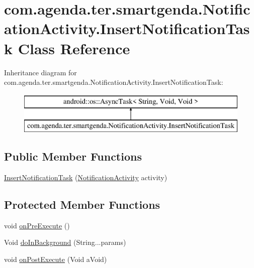 \hypertarget{classcom_1_1agenda_1_1ter_1_1smartgenda_1_1_notification_activity_1_1_insert_notification_task}{\section{com.\-agenda.\-ter.\-smartgenda.\-Notification\-Activity.\-Insert\-Notification\-Task Class Reference}
\label{classcom_1_1agenda_1_1ter_1_1smartgenda_1_1_notification_activity_1_1_insert_notification_task}
}
Inheritance diagram for com.\-agenda.\-ter.\-smartgenda.\-Notification\-Activity.\-Insert\-Notification\-Task\-:\begin{figure}[H]
\begin{center}
\leavevmode
\includegraphics[height=2.000000cm]{classcom_1_1agenda_1_1ter_1_1smartgenda_1_1_notification_activity_1_1_insert_notification_task}
\end{center}
\end{figure}
\subsection*{Public Member Functions}
\begin{DoxyCompactItemize}
\item 
\hyperlink{classcom_1_1agenda_1_1ter_1_1smartgenda_1_1_notification_activity_1_1_insert_notification_task_a1f0ccf74c8407d3039a131873cbb4ee0}{Insert\-Notification\-Task} (\hyperlink{classcom_1_1agenda_1_1ter_1_1smartgenda_1_1_notification_activity}{Notification\-Activity} activity)
\end{DoxyCompactItemize}
\subsection*{Protected Member Functions}
\begin{DoxyCompactItemize}
\item 
void \hyperlink{classcom_1_1agenda_1_1ter_1_1smartgenda_1_1_notification_activity_1_1_insert_notification_task_ab882f4a619ece938eb677b4897eb543c}{on\-Pre\-Execute} ()
\item 
Void \hyperlink{classcom_1_1agenda_1_1ter_1_1smartgenda_1_1_notification_activity_1_1_insert_notification_task_a0460d27c76cd4c85f48d73bc92c0bc53}{do\-In\-Background} (String...\-params)
\item 
void \hyperlink{classcom_1_1agenda_1_1ter_1_1smartgenda_1_1_notification_activity_1_1_insert_notification_task_a60512f17c6a22ae3d3752698a8019148}{on\-Post\-Execute} (Void a\-Void)
\end{DoxyCompactItemize}


